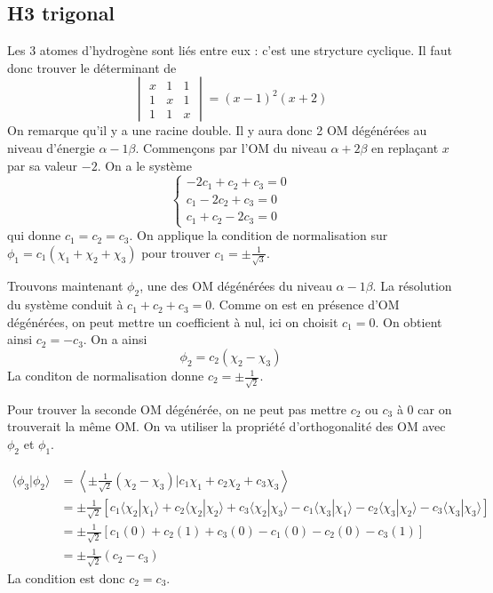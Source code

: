 \documentclass[french]{yLectureNote}
\begin{document}
\subsection{H3 trigonal}
Les 3 atomes d'hydrogène sont liés entre eux : c'est une strycture cyclique. Il faut donc trouver le déterminant de \[\begin{vmatrix}
x&1&1\\
1&x&1\\
1&1&x
\end{vmatrix} = (x-1)^2(x+2)\] On remarque qu'il y a une racine double. Il y aura donc 2 OM dégénérées au niveau d'énergie \(\alpha-1\beta\).
Commençons par l'OM du niveau \(\alpha+2\beta\) en replaçant \(x\) par sa valeur \(-2\). On a le système \[\left\{\begin{matrix}
-2c_1+c_2+c_3=0\\
c_1-2c_2+c_3=0\\
c_1+c_2-2c_3=0
\end{matrix}\right.\] qui donne \(c_1=c_2=c_3\). On applique la condition de normalisation sur \(\phi_1 = c_1(\chi_1+\chi_2+\chi_3)\) pour trouver \(c_1 = \pm \frac{1}{\sqrt{3}}\).

Trouvons maintenant \(\phi_2\), une des OM dégénérées du niveau \(\alpha-1\beta\). La résolution du système conduit à \(c_1+c_2+c_3 =0\). Comme on est en présence d'OM dégénérées, on peut mettre un coefficient à nul, ici on choisit \(c_1 = 0\). On obtient ainsi \(c_2=-c_3\). On a ainsi \[\phi_2 = c_2(\chi_2-\chi_3)\]La conditon de normalisation donne \(c_2 = \pm \frac{1}{\sqrt{2}}\).

Pour trouver la seconde OM dégénérée, on ne peut pas mettre \(c_2\) ou \(c_3\) à 0 car on trouverait la m\^eme OM. On va utiliser la propriété d'orthogonalité des OM avec \(\phi_2\) et \(\phi_1\).


\begin{align*}
\langle \phi_3 | \phi_2 \rangle &= \left\langle \pm \frac{1}{\sqrt{2}}(\chi_2 - \chi_3) \bigg| c_1\chi_1 + c_2\chi_2 + c_3\chi_3 \right\rangle \\
&= \pm \frac{1}{\sqrt{2}} \left[ c_1\langle\chi_2|\chi_1\rangle + c_2\langle\chi_2|\chi_2\rangle + c_3\langle\chi_2|\chi_3\rangle - c_1\langle\chi_3|\chi_1\rangle - c_2\langle\chi_3|\chi_2\rangle - c_3\langle\chi_3|\chi_3\rangle \right] \\
&= \pm \frac{1}{\sqrt{2}} \left[ c_1(0) + c_2(1) + c_3(0) - c_1(0) - c_2(0) - c_3(1) \right] \\
&= \pm \frac{1}{\sqrt{2}} (c_2 - c_3)
\end{align*}
La condition est donc $c_2 = c_3$.
\end{document}
